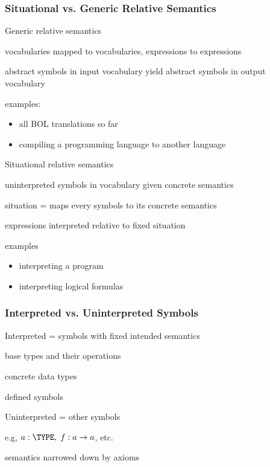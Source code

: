 \begin{frame}\frametitle{Situational vs. Generic Relative Semantics}
\begin{blockitems}{Generic relative semantics}
\item vocabularies mapped to vocabularies, expressions to expressions
\item abstract symbols in input vocabulary yield abstract symbols in output vocabulary
\item examples:
 \begin{itemize}
 \item all BOL translations so far
 \item compiling a programming language to another language
 \end{itemize}
\end{blockitems}

\begin{blockitems}{Situational relative semantics}
\item uninterpreted symbols in vocabulary given concrete semantics
\item situation = maps every symbols to its concrete semantics
\item expressions interpreted relative to fixed situation
\item examples
 \begin{itemize}
 \item interpreting a program 
 \item interpreting logical formulas 
 \end{itemize}
\end{blockitems}
\end{frame}

\begin{frame}\frametitle{Interpreted vs. Uninterpreted Symbols}
\begin{blockitems}{Interpreted = symbols with fixed intended semantics}
\item base types and their operations 
\item concrete data types 
\item defined symbols 
\end{blockitems}

\begin{blockitems}{Uninterpreted = other symbols}
\item e.g, $a:\TYPE,\;f:a\to a$, etc.
\item semantics narrowed down by axioms 
\end{blockitems}
\end{frame}

